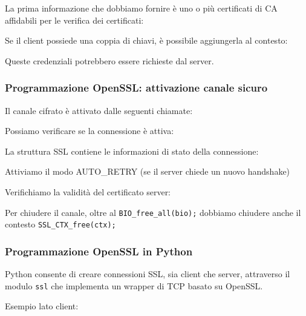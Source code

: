             La prima informazione che dobbiamo fornire è uno o più certificati di CA affidabili per le verifica dei certificati:

            

            Se il client possiede una coppia di chiavi, è possibile aggiungerla al contesto:

            

            Queste credenziali potrebbero essere richieste dal server.

        \subsubsection{Programmazione OpenSSL: attivazione canale sicuro}
            Il canale cifrato è attivato dalle seguenti chiamate:

            

            Possiamo verificare se la connessione è attiva:

            

            La struttura SSL contiene le informazioni di stato della connessione:

            

            Attiviamo il modo AUTO\_RETRY (se il server chiede un nuovo handshake)

            

            Verifichiamo la validità del certificato server:

            

            Per chiudere il canale, oltre al \verb|BIO_free_all(bio);| dobbiamo chiudere anche il contesto \verb|SSL_CTX_free(ctx);|

        \subsubsection{Programmazione OpenSSL in Python}
            Python consente di creare connessioni SSL, sia client che server, attraverso il modulo \verb|ssl| che implementa un wrapper di TCP basato su OpenSSL.

            Esempio lato client:

